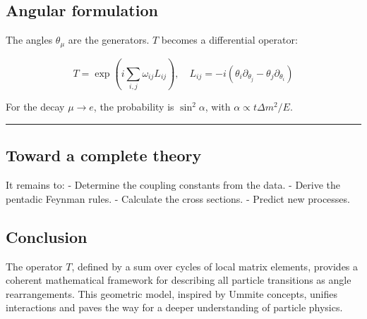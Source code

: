 \documentclass[11pt]{article}
\begin{document}
\hypertarget{angular-formulation}{%
\subsection{Angular formulation}\label{angular-formulation}}

The angles \(\theta_\mu\) are the generators. \(T\) becomes a
differential operator:

\[
T = \exp\!\left( i \sum_{i,j} \omega_{ij} L_{ij} \right), \quad L_{ij} = -i(\theta_i \partial_{\theta_j} - \theta_j \partial_{\theta_i})
\]

For the decay \(\mu \to e\), the probability is \(\sin^2\alpha\), with
\(\alpha \propto t \Delta m^2/E\).

\begin{center}\rule{0.5\linewidth}{0.5pt}\end{center}

\hypertarget{toward-a-complete-theory}{%
\subsection{Toward a complete theory}\label{toward-a-complete-theory}}

It remains to: - Determine the coupling constants from the data. -
Derive the pentadic Feynman rules. - Calculate the cross sections. -
Predict new processes.

\hypertarget{conclusion}{%
\subsection{Conclusion}\label{conclusion}}

The operator \(T\), defined by a sum over cycles of local matrix
elements, provides a coherent mathematical framework for describing all
particle transitions as angle rearrangements. This geometric model,
inspired by Ummite concepts, unifies interactions and paves the way for
a deeper understanding of particle physics.
\end{document}
